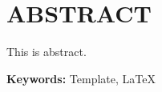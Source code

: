 \chapter{ABSTRACT}
\thispagestyle{onlyfoot}


This is abstract.


\vspace{1em}


{\noindent\textbf{Keywords:} Template, LaTeX
}







